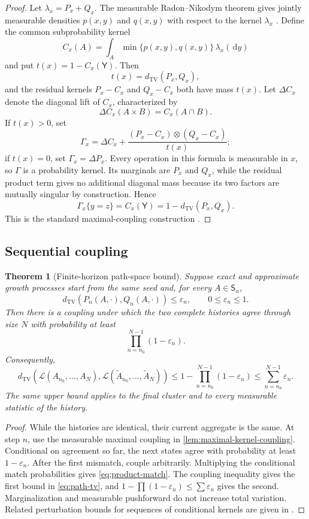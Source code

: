 \documentclass[11pt]{article}
\theoremstyle{mainthm}
\newtheorem{theorem}{Theorem}[section]
\theoremstyle{definition}
\theoremstyle{remark}
\newcommand{\dd}{\,\mathrm d}
\newcommand{\Law}{\mathcal L}
\newcommand{\dTV}{d_{\mathrm{TV}}}
\newcommand{\eps}{\varepsilon}
\begin{document}
\begin{proof}
Let $\lambda_x=P_x+Q_x$. The measurable Radon--Nikodym theorem gives jointly measurable densities $p(x,y)$ and $q(x,y)$ with respect to the kernel $\lambda_x$ \cite{Kallenberg2021}. Define the common subprobability kernel
\[
  C_x(A)=\int_A\min\{p(x,y),q(x,y)\}\,\lambda_x(\dd y)
\]
and put $t(x)=1-C_x(\mathsf Y)$. Then
\[
  t(x)=\dTV(P_x,Q_x),
\]
and the residual kernels $P_x-C_x$ and $Q_x-C_x$ both have mass $t(x)$. Let $\Delta C_x$ denote the diagonal lift of $C_x$, characterized by
\[
  \Delta C_x(A\times B)=C_x(A\cap B).
\]
If $t(x)>0$, set
\[
  \Gamma_x
  =\Delta C_x
   +\frac{(P_x-C_x)\otimes(Q_x-C_x)}{t(x)};
\]
if $t(x)=0$, set $\Gamma_x=\Delta P_x$. Every operation in this formula is measurable in $x$, so $\Gamma$ is a probability kernel. Its marginals are $P_x$ and $Q_x$, while the residual product term gives no additional diagonal mass because its two factors are mutually singular by construction. Hence
\[
  \Gamma_x\{y=z\}=C_x(\mathsf Y)=1-\dTV(P_x,Q_x).
\]
This is the standard maximal-coupling construction \cite{Lindvall1992,Thorisson2000}.
\end{proof}

\subsection{Sequential coupling}

\begin{theorem}[Finite-horizon path-space bound]
\label{thm:path-bound}
Suppose exact and approximate growth processes start from the same seed and, for every $A\in\mathsf S_n$,
\[
  \dTV(P_n(A,\cdot),Q_n(A,\cdot))\le\eps_n,
  \qquad 0\le\eps_n\le1.
\]
Then there is a coupling under which the two complete histories agree through size $N$ with probability at least
\begin{equation}
  \prod_{n=n_0}^{N-1}(1-\eps_n).
  \label{eq:product-match}
\end{equation}
Consequently,
\begin{equation}
\boxed{
  \dTV\!\left(
  \Law(A_{n_0},\ldots,A_N),
  \Law(\widetilde A_{n_0},\ldots,\widetilde A_N)
  \right)
  \le1-\prod_{n=n_0}^{N-1}(1-\eps_n)
  \le\sum_{n=n_0}^{N-1}\eps_n.
}
\label{eq:path-tv}
\end{equation}
The same upper bound applies to the final cluster and to every measurable statistic of the history.
\end{theorem}

\begin{proof}
While the histories are identical, their current aggregate is the same. At step $n$, use the measurable maximal coupling in \cref{lem:maximal-kernel-coupling}. Conditional on agreement so far, the next states agree with probability at least $1-\eps_n$. After the first mismatch, couple arbitrarily. Multiplying the conditional match probabilities gives \eqref{eq:product-match}. The coupling inequality gives the first bound in \eqref{eq:path-tv}, and $1-\prod(1-\eps_n)\le\sum\eps_n$ gives the second. Marginalization and measurable pushforward do not increase total variation. Related perturbation bounds for sequences of conditional kernels are given in \cite{AbateRedigTkachev2014}.
\end{proof}
\end{document}
